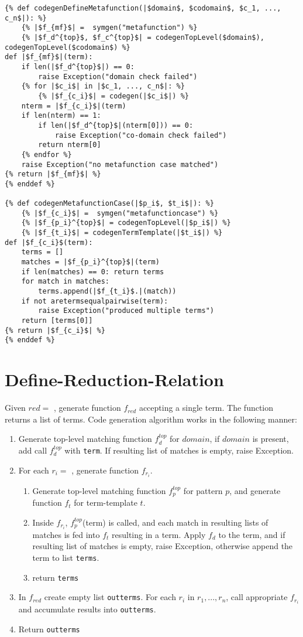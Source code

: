 \begin{verbatim}
{% def codegenDefineMetafunction(|$domain$, $codomain$, $c_1, ..., c_n$|): %}
	{% |$f_{mf}$| =  symgen("metafunction") %}
	{% |$f_d^{top}$, $f_c^{top}$| = codegenTopLevel($domain$), codegenTopLevel($codomain$) %}
def |$f_{mf}$|(term):
	if len(|$f_d^{top}$|) == 0: 
		raise Exception("domain check failed")
	{% for |$c_i$| in |$c_1, ..., c_n$|: %}
		{% |$f_{c_i}$| = codegen(|$c_i$|) %}
	nterm = |$f_{c_i}$|(term)
	if len(nterm) == 1:
		if len(|$f_d^{top}$|(nterm[0])) == 0:
			raise Exception("co-domain check failed")
		return nterm[0]
	{% endfor %}
	raise Exception("no metafunction case matched")
{% return |$f_{mf}$| %}
{% enddef %}

{% def codegenMetafunctionCase(|$p_i$, $t_i$|): %}
	{% |$f_{c_i}$| =  symgen("metafunctioncase") %}
	{% |$f_{p_i}^{top}$| = codegenTopLevel(|$p_i$|) %}
	{% |$f_{t_i}$| = codegenTermTemplate(|$t_i$|) %}
def |$f_{c_i}$(term):
	terms = []
	matches = |$f_{p_i}^{top}$|(term)
	if len(matches) == 0: return terms 
	for match in matches:
		terms.append(|$f_{t_i}$.|(match))
	if not aretermsequalpairwise(term):
		raise Exception("produced multiple terms")
	return [terms[0]]
{% return |$f_{c_i}$| %}
{% enddef %}
\end{verbatim}

\section{Define-Reduction-Relation}
Given $red=$ \DefineReductionRelation, generate function $f_{red}$ accepting a single term. The function returns a list of terms. Code generation algorithm works in the following manner:

\begin{enumerate}
\item Generate top-level matching function $f_d^{top}$ for $domain$, if $domain$ is present, add call $f_d^{top}$ with \texttt{term}. If resulting list of matches is empty, raise Exception.
\item For each $r_i= $ \ReductionCase, generate function $f_{r_i}$.
	\begin{enumerate}
	\item Generate top-level matching function $f_p^{top}$ for pattern $p$, and generate function $f_t$ for term-template $t$.
	\item Inside $f_{r_i}$, $f_p^{top}$(term) is called, and each match in resulting lists of matches is fed into $f_t$ resulting in a term. Apply $f_d$ to the term, and if resulting list of matches is empty, raise Exception, otherwise append the term to list \texttt{terms}.
	\item return \texttt{terms}
	\end{enumerate}
\item In $f_{red}$ create empty list \texttt{outterms}. For each $r_i$ in $r_1, ..., r_n$, call appropriate $f_{r_i}$ and accumulate results into \texttt{outterms}.
\item Return \texttt{outterms}
\end{enumerate}

